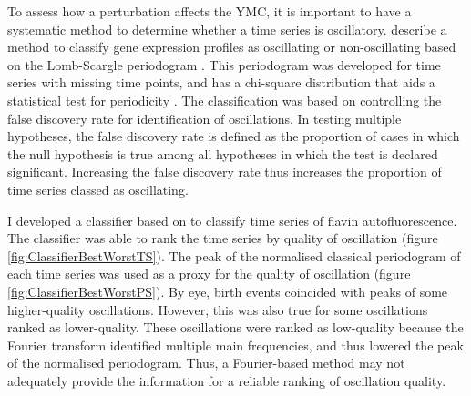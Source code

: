 
To assess how a perturbation affects the YMC, it is important to have a systematic method to determine whether a time series is oscillatory.
\citet{glynnDetectingPeriodicPatterns2006} describe a method to classify gene expression profiles as oscillating or non-oscillating based on the Lomb-Scargle periodogram \citep{lombLeastsquaresFrequencyAnalysis1976}.
This periodogram was developed for time series with missing time points, and has a chi-square distribution that aids a statistical test for periodicity \citep{scargleStudiesAstronomicalTime1982}.
The classification was based on controlling the false discovery rate for identification of oscillations.
In testing multiple hypotheses, the false discovery rate is defined as the proportion of cases in which the null hypothesis is true among all hypotheses in which the test is declared significant.
Increasing the false discovery rate thus increases the proportion of time series classed as oscillating.

I developed a classifier based on \citet{glynnDetectingPeriodicPatterns2006} to classify time series of flavin autofluorescence.
The classifier was able to rank the time series by quality of oscillation (figure \ref{fig:ClassifierBestWorstTS}).
The peak of the normalised classical periodogram of each time series was used as a proxy for the quality of oscillation (figure \ref{fig:ClassifierBestWorstPS}).
By eye, birth events coincided with peaks of some higher-quality oscillations.
However, this was also true for some oscillations ranked as lower-quality.
These oscillations were ranked as low-quality because the Fourier transform identified multiple main frequencies, and thus lowered the peak of the normalised periodogram.
Thus, a Fourier-based method may not adequately provide the information for a reliable ranking of oscillation quality.


